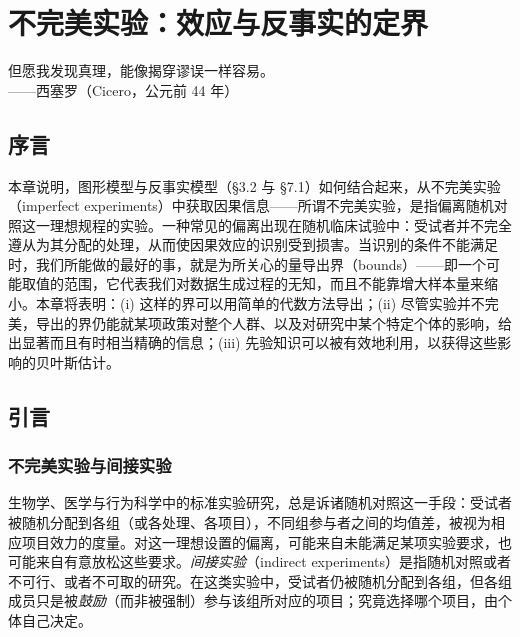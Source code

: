 \chapter{不完美实验：效应与反事实的定界}

\begin{flushright}
\kaishu\small
但愿我发现真理，能像揭穿谬误一样容易。\\[2pt]
——西塞罗（Cicero，公元前 44 年）
\end{flushright}

\section*{序言}

本章说明，图形模型与反事实模型（\S 3.2 与 \S 7.1）如何结合起来，从不完美实验（imperfect experiments）中获取因果信息——所谓不完美实验，是指偏离随机对照这一理想规程的实验。一种常见的偏离出现在随机临床试验中：受试者并不完全遵从为其分配的处理，从而使因果效应的识别受到损害。当识别的条件不能满足时，我们所能做的最好的事，就是为所关心的量导出界（bounds）——即一个可能取值的范围，它代表我们对数据生成过程的无知，而且不能靠增大样本量来缩小。本章将表明：(i) 这样的界可以用简单的代数方法导出；(ii) 尽管实验并不完美，导出的界仍能就某项政策对整个人群、以及对研究中某个特定个体的影响，给出显著而且有时相当精确的信息；(iii) 先验知识可以被有效地利用，以获得这些影响的贝叶斯估计。

\section{引言}

\subsection{不完美实验与间接实验}

生物学、医学与行为科学中的标准实验研究，总是诉诸随机对照这一手段：受试者被随机分配到各组（或各处理、各项目），不同组参与者之间的均值差，被视为相应项目效力的度量。对这一理想设置的偏离，可能来自未能满足某项实验要求，也可能来自有意放松这些要求。\emph{间接实验}（indirect experiments）是指随机对照或者不可行、或者不可取的研究。在这类实验中，受试者仍被随机分配到各组，但各组成员只是被\emph{鼓励}（而非被强制）参与该组所对应的项目；究竟选择哪个项目，由个体自己决定。


